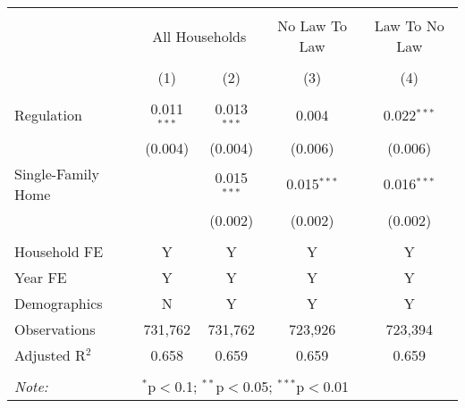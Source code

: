 
\begin{table}[!htbp] \centering 
  \caption{} 
  \label{} 
\begin{tabular}{@{\extracolsep{5pt}}lcccc} 
\\[-1.8ex]\hline 
\hline \\[-1.8ex] 
 & \multicolumn{2}{c}{All Households} & No Law To Law & Law To No Law \\ 
\\[-1.8ex] & (1) & (2) & (3) & (4)\\ 
\hline \\[-1.8ex] 
 Regulation & 0.011$^{***}$ & 0.013$^{***}$ & 0.004 & 0.022$^{***}$ \\ 
  & (0.004) & (0.004) & (0.006) & (0.006) \\ 
  Single-Family Home &  & 0.015$^{***}$ & 0.015$^{***}$ & 0.016$^{***}$ \\ 
  &  & (0.002) & (0.002) & (0.002) \\ 
 \hline \\[-1.8ex] 
Household FE & Y & Y & Y & Y \\ 
Year FE & Y & Y & Y & Y \\ 
Demographics & N & Y & Y & Y \\ 
Observations & 731,762 & 731,762 & 723,926 & 723,394 \\ 
Adjusted R$^{2}$ & 0.658 & 0.659 & 0.659 & 0.659 \\ 
\hline 
\hline \\[-1.8ex] 
\textit{Note:}  & \multicolumn{4}{l}{$^{*}$p$<$0.1; $^{**}$p$<$0.05; $^{***}$p$<$0.01} \\ 
\end{tabular} 
\end{table} 

